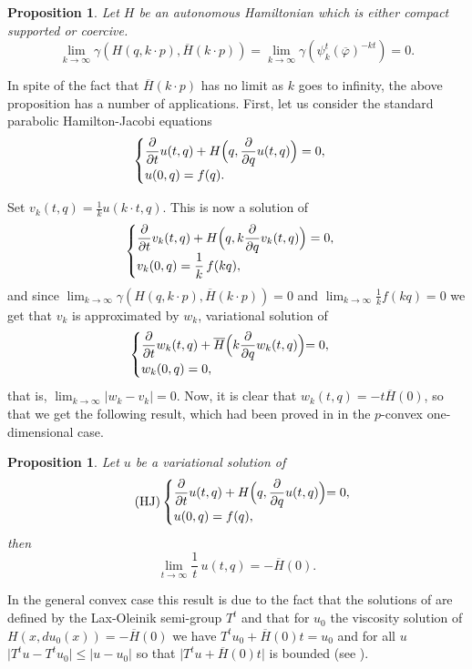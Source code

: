 \documentclass[JEP,XML,SOM,NoFloatCountersInSection,Unicode,published]{cedram}
\newcommand{\HJ}{\mathrm{HJ}}
\numberwithin{equation}{section}
\let \phi \varphi
\theoremstyle{plain}
\newtheorem{proposition}[theorem]{Proposition}
\theoremstyle{definition}
\theoremstyle{remark}
\begin{document}
\begin{proposition}\label{10.1}
Let $H$ be an autonomous Hamiltonian which is either compact supported or coercive.
\[
\lim_{k\to \infty} \gamma (H(q,k\cdot p), {\overline H}(k\cdot p)) =\lim_{k \to \infty} \gamma (\psi_{k}^{t}(\overline \phi)^{-kt})=0.
\]
\end{proposition}

In spite of the fact that $\overline H (k\cdot p)$ has no limit as $k$ goes to infinity, the above proposition has a number of applications.
First, let us consider
the standard parabolic Hamilton-Jacobi equations
\[
\begin{cases}
\dfrac{\partial}{\partial t} u(t,q) + H \Bigl(q,
\dfrac{\partial}{\partial q} u(t,q)\Bigr) = 0, \\ u(0,q)=f(q).
\end{cases}
\]

Set $v_{k}(t,q)= \frac{1}{k}u(k\cdot t,q)$. This is now a solution of
\[
\begin{cases}
\dfrac{\partial}{\partial t} v_{k}(t,q) + H \Bigl(q,
k\dfrac{\partial}{\partial q} v_{k}(t,q)\Bigr) = 0, \\ v_{k}(0,q)=\dfrac{1}{k}\,f(kq),
\end{cases}
\]
and since $\lim_{k\to \infty}\gamma (H(q,k\cdot p), \overline H(k\cdot p))=0$ and $\lim_{k\to \infty}\frac{1}{k}f(kq)=0$ we get that
$v_{k}$ is approximated by $w_{k}$, variational solution of
\[
\begin{cases}
\dfrac{\partial}{\partial t} w_{k}(t,q) + \overline H \Bigl(k\dfrac{\partial}{\partial q} w_{k}(t,q)\Bigl) = 0, \\ w_{k}(0,q)=0,
\end{cases}
\]
that is, $\lim_{k\to \infty} \vert w_{k}-v_{k} \vert =0$. Now, it is clear that $w_{k}(t,q)=-t\overline H(0)$, so that
we get
the following result, which had been proved in \cite{L-P-V} in the $p$-convex one-dimensional case.
\begin{proposition} \label{prop-9.2}
Let $u$ be a variational solution of
\[
\tag{$\HJ$}
\begin{cases}
\dfrac{\partial}{\partial t} u (t,q) + H \Bigl(q,
\dfrac{\partial}{\partial q} u(t,q)\Bigl) = 0, \\ u(0,q)=f(q), &
\end{cases}
\]
then
\[
\lim_{t\to \infty} \frac{1}{t}\,u(t,q)= -\overline H(0).
\]
\end{proposition}
In the general convex case this result is due to the fact that the solutions of
\thetag{$\HJ$} are defined by the
Lax-Oleinik semi-group $T^t$ and that for $u_0$ the viscosity solution of $H(x,du_0(x))=-\overline H(0)$ we have $T^tu_0+\overline H(0)t=u_0$ and for all $u$
$ \vert T^t u - T^t u_0 \vert \leq \vert u- u_0 \vert $ so that $ \vert T^tu+\overline H(0)t \vert$ is bounded (see \cite{Fathi1, Fathi2}).
\end{document}
